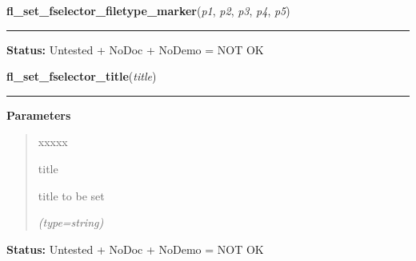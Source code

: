 \hspace{.8\funcindent}\begin{boxedminipage}{\funcwidth}

    \raggedright \textbf{fl\_set\_fselector\_filetype\_marker}(\textit{p1}, \textit{p2}, \textit{p3}, \textit{p4}, \textit{p5})

    \vspace{-1.5ex}

    \rule{\textwidth}{0.5\fboxrule}
\setlength{\parskip}{2ex}
\setlength{\parskip}{1ex}
\textbf{Status:} Untested + NoDoc + NoDemo = NOT OK



    \end{boxedminipage}

    \label{xformslib:flgoodies:fl_set_fselector_title}

    \vspace{0.5ex}

\hspace{.8\funcindent}\begin{boxedminipage}{\funcwidth}

    \raggedright \textbf{fl\_set\_fselector\_title}(\textit{title})

    \vspace{-1.5ex}

    \rule{\textwidth}{0.5\fboxrule}
\setlength{\parskip}{2ex}
\setlength{\parskip}{1ex}
      \textbf{Parameters}
      \vspace{-1ex}

      \begin{quote}
        \begin{Ventry}{xxxxx}

          \item[title]

          title to be set

            {\it (type=string)}

        \end{Ventry}

      \end{quote}

\textbf{Status:} Untested + NoDoc + NoDemo = NOT OK



    \end{boxedminipage}

    \label{xformslib:flgoodies:fl_goodies_atclose}

